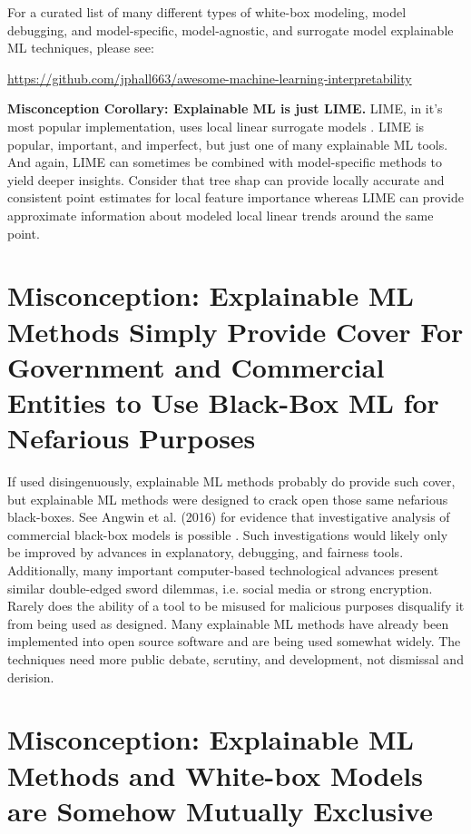 \documentclass{article}
\begin{document}
For a curated list of many different types of white-box modeling, model debugging, and model-specific, model-agnostic, and surrogate model explainable ML techniques, please see:
\begin{center}
\url{https://github.com/jphall663/awesome-machine-learning-interpretability}
\end{center}

\textbf{Misconception Corollary: Explainable ML is just LIME.} LIME, in it's most popular implementation, uses local linear surrogate models \cite{lime}. LIME is popular, important, and imperfect, but just one of many explainable ML tools. And again, LIME can sometimes be combined with model-specific methods to yield deeper insights. Consider that tree shap can provide locally accurate and consistent point estimates for local feature importance whereas LIME can provide approximate information about modeled local linear trends around the same point.   

\section{Misconception: Explainable ML Methods Simply Provide Cover For Government and Commercial Entities to Use Black-Box ML for Nefarious Purposes}

If used disingenuously, explainable ML methods probably do provide such cover, but explainable ML methods were designed to crack open those same nefarious black-boxes. See Angwin et al. (2016) for evidence that investigative analysis of commercial black-box models is possible \cite{angwin16}. Such investigations would likely only be improved by advances in explanatory, debugging, and fairness tools. \\

Additionally, many important computer-based technological advances present similar double-edged sword dilemmas, i.e. social media or strong encryption. Rarely does the ability of a tool to be misused for malicious purposes  disqualify it from being used as designed. Many explainable ML methods have already been implemented into open source software and are being used somewhat widely. The techniques need more public debate, scrutiny, and development, not dismissal and derision.

\section{Misconception: Explainable ML Methods and White-box Models are Somehow Mutually Exclusive}
\end{document}
